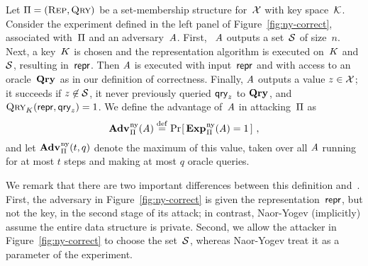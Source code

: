 %
Let $\mathrm{\Pi} = (\textsc{Rep}, \textsc{Qry})$ be a set-membership structure
for~$\mathcal{X}$ with key space~$\mathcal{K}$.
Consider the \ny experiment defined in the left panel of
Figure~\ref{fig:ny-correct}, associated with~$\mathrm{\Pi}$ and an adversary~$\mathit{A}$.
%
First, ~$\mathit{A}$  outputs a set~$\mathcal{S}$ of size~$n$.
%
Next, a key~$K$ is chosen and the representation algorithm
is executed on~$K$ and $\mathcal{S}$, resulting in~$\mathsf{repr}$.
%
Then $\mathit{A}$ is executed with input~$\mathsf{repr}$ and with access to
an oracle~$\mathbf{Qry}\hspace{0.5pt}$ as in our definition of correctness.
%
Finally, $\mathit{A}$ outputs a value $z \in \mathcal{X}$; it succeeds if
$z \not\in \mathcal{S}$, it never previously queried $\mathsf{qry}_z$
to $\mathbf{Qry}\hspace{0.5pt}$, and $\textsc{Qry}_K(\mathsf{repr}, \mathsf{qry}_z)=1$.
%
We define the advantage of~$\mathit{A}$ in attacking~$\mathrm{\Pi}$ as
\[
  \Adv{\ny}_{\struct}(\advA) \bydef
  \Prob{\Exp{\ny}_{\struct}(\advA)=1}\,,
\]
%
and let $\Adv{\ny}_{\struct}(t, q)$ denote the maximum of
this value, taken over all $\mathit{A}$ running for at most $t$
steps and making at most $q$ oracle queries.

We remark that there are two important differences between this
definition and~\cite[Definition~2.4]{naor2015bloom}.
%
First, the adversary in Figure~\ref{fig:ny-correct} is given
the representation~$\mathsf{repr}$, but not the key, in the second
stage of its attack; in contrast, Naor-Yogev (implicitly)
assume the entire data structure is private.
%
Second, we allow the attacker in Figure~\ref{fig:ny-correct} to
choose the set~$\mathcal{S}$, whereas Naor-Yogev treat it as a
parameter of the experiment.

